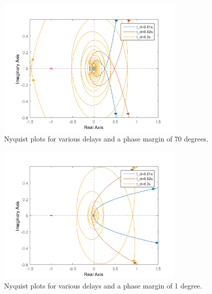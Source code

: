 \begin{figure}[H]
    \centering
    \includegraphics[width=0.8\textwidth]{resources/png/nyquist-70.png}
    \caption{Nyquist plots for various delays and a phase margin of 70 degrees.}
    \label{fig:nyquist-70}
\end{figure}
\begin{figure}[H]
    \centering
    \includegraphics[width=0.8\textwidth]{resources/png/nyquist-1.png}
    \caption{Nyquist plots for various delays and a phase margin of 1 degree.}
    \label{fig:nyquist-1}
\end{figure}
